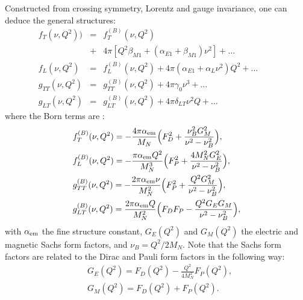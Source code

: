 \documentclass[twocolumn,prc,showpacs,nofootinbib,preprintnumbers,amsmath,amssymb,superscriptaddress]{revtex4-1}
\def\eqlab#1{\label{eq:#1}}
\def\nn{\nonumber}
\begin{document}
\vfill\null
Constructed from crossing symmetry, Lorentz and gauge invariance, one can deduce the general structures: 
\begin{subequations}
\eqlab{fgFunctions}
\begin{eqnarray}
  f_T(\nu, Q^2))&=& f_T^{(B)}(\nu, Q^2)\nn\\
 &+&4\pi\left[ Q^2 \beta_{M1} +(\alpha_{E1} + \beta_{M1}) \nu^2\right] + \dots \label{Eq:LEX-fT}\\
  f_L(\nu, Q^2)&=& f_L^{(B)}(\nu, Q^2) + 4 \pi(\alpha_{E1}+\alpha_{L} \nu^2) Q^2 + \dots \qquad \label{Eq:LEX-fL}\\
  g_{TT}(\nu, Q^2)&=&g^{(B)}_{TT}(\nu, Q^2) + 4 \pi\gamma_0  \nu^3 + \dots \label{Eq:LEX-gTT}\\
  g_{LT}(\nu, Q^2)&=&g^{(B)}_{LT}(\nu, Q^2) +  4 \pi\delta_{LT} \nu^2 Q + \dots \label{Eq:LEX-gLT}
\end{eqnarray}
\end{subequations}
\newpage
where the Born terms are \cite{Drechsel:2002ar}:
\begin{subequations}
\begin{align}
 & f_T^{(B)}(\nu, Q^2) =  - \frac{4\pi \alpha_{\rm em}}{M_N} \Big( F_D^2 + \frac{\nu_B^2 G_M^2}{\nu^2-\nu_B^2} \Big), \label{Eq:BT-fT}\\
  &  f_L^{(B)}(\nu, Q^2) = - \frac{\pi \alpha_{\rm em} Q^2}{ M_N^3} \Big( F_P^2 + \frac{4M_N^2 G_E^2}{\nu^2-\nu_B^2} \Big), \label{Eq:BT-fL}\\
 & g^{(B)}_{TT}(\nu, Q^2) = - \frac{2\pi \alpha_{\rm em} \nu}{ M_N^2} \Big( F_P^2 + \frac{Q^2 G_M^2}{\nu^2-\nu_B^2} \Big), \label{Eq:BT-gTT}\\
 & g^{(B)}_{LT}(\nu, Q^2) =  \frac{2 \pi\alpha_{\rm em} Q}{M_N^2} \Big( F_D F_P - \frac{Q^2 G_E G_M }{\nu^2-\nu_B^2} \Big), \label{Eq:BT-gTL}
\end{align}
\end{subequations}
with $\alpha_{\rm em}$ the fine structure constant, $G_E(Q^2)$ and $G_M(Q^2)$ the electric and magnetic Sachs form factors, and $\nu_B=Q^2/2M_N$. Note that the Sachs form factors are related to the Dirac and Pauli form factors in the following way:
\begin{subequations}
\begin{align}
& G_E(Q^2)=F_D(Q^2) - \frac{Q^2}{4M_N^2} F_P(Q^2),\\
& G_M(Q^2)=F_D(Q^2) + F_P(Q^2).
\end{align}
\end{subequations}
\end{document}
